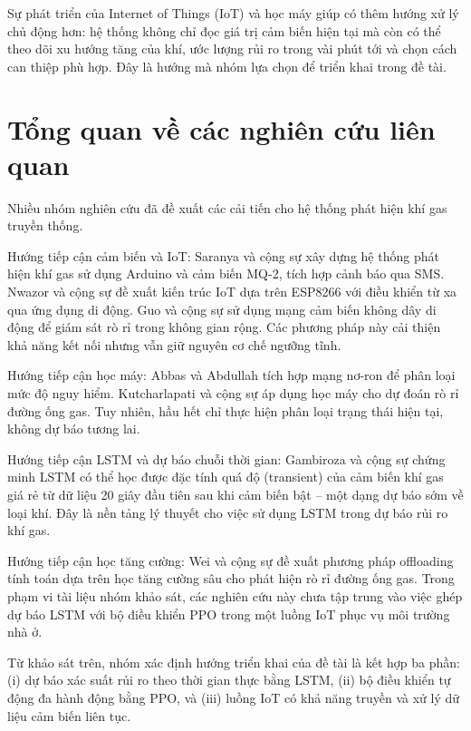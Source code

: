 Sự phát triển của Internet of Things (IoT) và học máy giúp có thêm hướng xử lý chủ động hơn: hệ thống không chỉ đọc giá trị cảm biến hiện tại mà còn có thể theo dõi xu hướng tăng của khí, ước lượng rủi ro trong vài phút tới và chọn cách can thiệp phù hợp. Đây là hướng mà nhóm lựa chọn để triển khai trong đề tài.

\section{Tổng quan về các nghiên cứu liên quan}

Nhiều nhóm nghiên cứu đã đề xuất các cải tiến cho hệ thống phát hiện khí gas truyền thống.

Hướng tiếp cận cảm biến và IoT: Saranya và cộng sự \cite{saranya2023} xây dựng hệ thống phát hiện khí gas sử dụng Arduino và cảm biến MQ-2, tích hợp cảnh báo qua SMS. Nwazor và cộng sự \cite{nwazor2023} đề xuất kiến trúc IoT dựa trên ESP8266 với điều khiển từ xa qua ứng dụng di động. Guo và cộng sự \cite{guo2019} sử dụng mạng cảm biến không dây di động để giám sát rò rỉ trong không gian rộng. Các phương pháp này cải thiện khả năng kết nối nhưng vẫn giữ nguyên cơ chế ngưỡng tĩnh.

Hướng tiếp cận học máy: Abbas và Abdullah \cite{abbas2021} tích hợp mạng nơ-ron để phân loại mức độ nguy hiểm. Kutcharlapati và cộng sự \cite{kutcharlapati2023} áp dụng học máy cho dự đoán rò rỉ đường ống gas. Tuy nhiên, hầu hết chỉ thực hiện phân loại trạng thái hiện tại, không dự báo tương lai.

Hướng tiếp cận LSTM và dự báo chuỗi thời gian: Gambiroza và cộng sự \cite{gambiroza2020} chứng minh LSTM có thể học được đặc tính quá độ (transient) của cảm biến khí gas giá rẻ từ dữ liệu 20 giây đầu tiên sau khi cảm biến bật -- một dạng dự báo sớm về loại khí. Đây là nền tảng lý thuyết cho việc sử dụng LSTM trong dự báo rủi ro khí gas.

Hướng tiếp cận học tăng cường: Wei và cộng sự \cite{wei2022} đề xuất phương pháp offloading tính toán dựa trên học tăng cường sâu cho phát hiện rò rỉ đường ống gas. Trong phạm vi tài liệu nhóm khảo sát, các nghiên cứu này chưa tập trung vào việc ghép dự báo LSTM với bộ điều khiển PPO trong một luồng IoT phục vụ môi trường nhà ở.

Từ khảo sát trên, nhóm xác định hướng triển khai của đề tài là kết hợp ba phần: (i) dự báo xác suất rủi ro theo thời gian thực bằng LSTM, (ii) bộ điều khiển tự động đa hành động bằng PPO, và (iii) luồng IoT có khả năng truyền và xử lý dữ liệu cảm biến liên tục.

